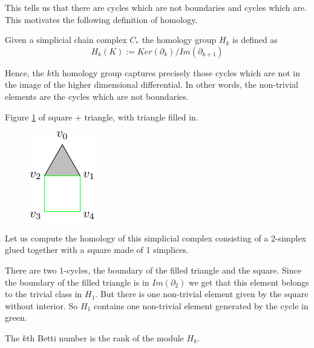 This tells us that there are cycles which are not boundaries and cycles which are. This motivates the following definition of homology.
\begin{definition}
  Given a simplicial chain complex \hspace{0.05cm}$C_{*}$ the homology group $H_{k}$ is defined as
  \[H_{k}(K) := Ker(\partial_{k})/Im(\partial_{k+1})\]
\end{definition}

Hence, the $k$th homology group captures precisely those cycles which are not in the image of the higher dimensional differential. In other words, the non-trivial elements are the cycles which are not boundaries.

%
\begin{example}
Figure \ref{trihom} of square + triangle, with triangle filled in.
\begin{figure}[ht]
  \centering
  \includegraphics[scale=2]{trisquarefilled.pdf}
  \caption{\label{trihom} }
\end{figure}
Let us compute the homology of this simplicial complex consisting of a 2-simplex glued together with a square made of 1 simplices.

There are two 1-cycles, the boundary of the filled triangle and the square. Since the boundary of the filled triangle is in $Im (\partial_{2})$ we get that this element belongs to the trivial class in $H_{1}$. But there is one non-trivial element given by the square without interior. So $H_{1}$ contains one non-trivial element generated by the cycle in green.

\begin{definition}
The $k$th Betti number is the rank of the module $H_{k}$.
\end{definition}
\end{example}

